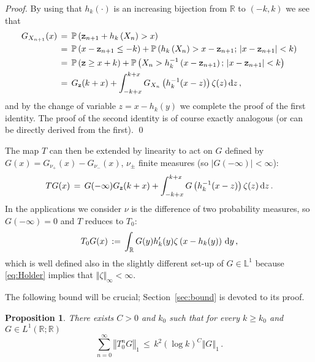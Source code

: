 \documentclass[reqno,11pt]{amsart}
\numberwithin{equation}{section}
\newtheorem{proposition}[theorem]{Proposition}
\newcommand{\dd}{\,\text{\rm d}}             %
\newcommand{\bbL}{{\ensuremath{\mathbb L}} }
\newcommand{\bbP}{{\ensuremath{\mathbb P}} }
\newcommand{\bbR}{{\ensuremath{\mathbb R}} }
\newcommand{\gz}{\zeta}
\newcommand{\logZ}{\mathtt{z}}
\begin{document}
\medskip

\noindent
\emph{Proof.} By using that $h_k(\cdot)$ is an increasing bijection from $\bbR$ to $(-k,k)$ we see that
\begin{equation}
\begin{split}
G_{X_{n+1}}(x)\, &=\, \bbP\left( \logZ_{n+1} +h_k\left( X_n\right) >x \right) 
\\
&=\, \bbP \left( x-  \logZ_{n+1}\le -k\right)+\bbP\left(h_k\left( X_n\right) >x-  \logZ_{n+1} ; \, \vert x-  \logZ_{n+1}\vert <k \right) 
\\
&=\,  \bbP \left( \logZ \ge x+k\right)+\bbP\left(X_n >h_k^{-1}\left(x-  \logZ_{n+1}\right) ; \, \vert x-  \logZ_{n+1}\vert <k \right)
\\
&=\,  G_{\logZ}(k+x) + \int_{-k+x}^{k+x} G_{X_n}\left( h_k^{-1}(x-z)\right) \gz(z) \dd z\, ,
\end{split}
\end{equation}
and by the change of variable $z=x-h_k(y)$ we complete the proof of the first identity. The proof of the second identity is of course exactly analogous (or can be directly derived from the first).
\qed

\medskip

The map $T$ can then be extended by linearity to act on $G$ defined by 
$G(x)=G_{\nu_+}(x)- G_{\nu_-}(x)$, $\nu_\pm$ finite measures (so $\vert G(-\infty)\vert < \infty$):
\begin{equation}
\label{eq:GXT}
 T G(x)\, =\, G(-\infty)G_{\logZ}(k+x) + \int_{-k+x}^{k+x} G\left( h_k^{-1}(x-z)\right) \gz(z) \dd z
\, .
\end{equation}
In the applications we consider $\nu$ is  the difference of two probability measures, so $G(-\infty)=0$ and
$T$ reduces to $T_0$:
\begin{equation}
T_0 G (x)\, :=\, \int_\bbR G(y)h_k'(y) \gz\left( x-h_k(y)\right) \dd y\, ,
\end{equation}
which is well defined  also in the slightly different set-up of  $G\in \bbL^1$ because \eqref{eq:Holder} implies that
$\Vert \gz \Vert_\infty < \infty$. 
\smallskip

The following bound will be crucial; Section~\ref{sec:bound} is devoted to its proof.


 \medskip

\begin{proposition}
\label{th:bound}
There exists $C>0$ and $k_0$ such that for every $k \ge k_0$ and 
 $G\in L^1(\bbR; \bbR)$
\begin{equation} 
\label{eq:bound}
\sum_{n=0}^\infty \left \Vert T_0^n G \right\Vert_1 \, \le \, k^2 \left( \log k \right)^C \left \Vert G \right\Vert_1\, .
\end{equation}
\end{proposition} 
 
\end{document}
